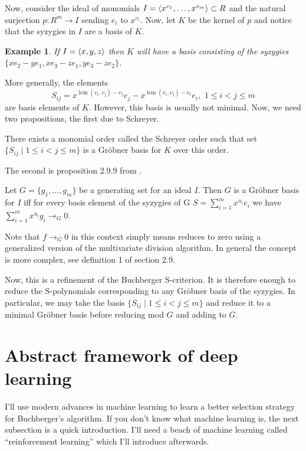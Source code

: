 \documentclass{article}
\theoremstyle{changedot}
\theoremstyle{changedotbreak}
\theoremstyle{nonumberplain}
\newtheorem{example}{Example}
\DeclarePairedDelimiter{\tuple}{\langle}{\rangle}
\DeclareMathOperator{\lcm}{lcm}
\begin{document}
Now, consider the ideal of monomials $I = \tuple{x^{v_{1}}, \dots, x^{v_{m}}} \subset R$ and the natural surjection $p : R^{m} \to I$ sending $e_{i}$ to $x^{v_{i}}$. Now, let $K$ be the kernel of $p$ and notice that the syzygies in $I$ are a basis of $K$.

\begin{example}
If $I = \tuple{x, y, z}$ then $K$ will have a basis consisting of the syzygies $\{x e_{2} - y e_{1}, x e_{3} - z e_{1}, y e_{3} - z e_{2}\}$.
\end{example}

More generally, the elements \[S_{ij} = x^{\lcm(v_{i}, v_{j}) - v_{j}} e_{j} - x^{\lcm(v_{i}, v_{j}) - v_{i}} e_{i}, \, \, 1 \leq i < j \leq m\] are basis elements of $K$. However, this basis is usually not minimal. Now, we need two propositions, the first due to Schreyer.

\begin{theorem}
 There exists a monomial order called the Schreyer order such that set $\{S_{ij} \mid 1 \leq i < j \leq m\}$ is a Gröbner basis for $K$ over this order.
\end{theorem}

The second is proposition 2.9.9 from \cite{IVA}.

\begin{theorem}
  Let $G = \{g_{1}, \dots, g_{m}\}$ be a generating set for an ideal $I$. Then $G$ is a Gröbner basis for $I$ iff for every basis element of the syzygies of G $S = \sum_{i = 1}^{m} x^{u_{i}} e_{i}$ we have $\sum_{i=1}^{m} x^{u_{i}} g_{i} \to_{G} 0$.
\end{theorem}

Note that $f \to_{G} 0$ in this context simply means reduces to zero using a generalized version of the multivariate division algorithm. In general the concept is more complex, see \cite{IVA} definition 1 of section 2.9.

Now, this is a refinement of the Buchberger S-criterion. It is therefore enough to reduce the S-polynomials corresponding to any Gröbner basis of the syzygies. In particular, we may take the basis $\{S_{ij} \mid 1 \leq i < j \leq m\}$ and reduce it to a minimal Gröbner basis before reducing mod $G$ and adding to $G$.


\section{Abstract framework of deep learning}

I'll use modern advances in machine learning to learn a better selection strategy for Buchberger's algorithm. If you don't know what machine learning is, the next subsection is a quick introduction. I'll need a beach of machine learning called ``reinforcement learning'' which I'll introduce afterwards.
\end{document}

